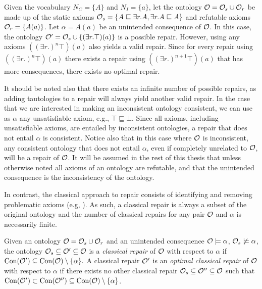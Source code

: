 \begin{example}\label{ex:no-optimal}
  Given the vocabulary $N_C = \{ A \}$ and $N_I = \{ a \}$, let the ontology $\mathcal{O} = \mathcal{O}_s \cup \mathcal{O}_r$ be made up of the static axioms $\mathcal{O}_s = \{ A \sqsubseteq \exists r.A, \exists r.A \sqsubseteq A \}$ and refutable axioms $\mathcal{O}_r = \{ A(a) \}$. Let $\alpha = A(a)$ be an unintended consequence of $\mathcal{O}$. In this case, the ontology $\mathcal{O}' = \mathcal{O}_s \cup \{ (\exists r.\top) (a) \}$ is a possible repair. However, using any axioms $((\exists r.)^n\top) (a)$ also yields a valid repair. Since for every repair using $((\exists r.)^n\top) (a)$ there exists a repair using $((\exists r.)^{n + 1}\top) (a)$ that has more consequences, there exists no optimal repair.
\end{example}

It should be noted also that there exists an infinite number of possible repairs, as adding tautologies to a repair will always yield another valid repair. In the case that we are interested in making an inconsistent ontology consistent, we can use as $\alpha$ any unsatisfiable axiom, e.g., $\top \sqsubseteq \bot$. Since all axioms, including unsatisfiable axioms, are entailed by inconsistent ontologies, a repair that does not entail $\alpha$ is consistent. Notice also that in this case where $\mathcal{O}$ is inconsistent, any consistent ontology that does not entail $\alpha$, even if completely unrelated to $\mathcal{O}$, will be a repair of $\mathcal{O}$. It will be assumed in the rest of this thesis that unless otherwise noted all axioms of an ontology are refutable, and that the unintended consequence is the inconsistency of the ontology.

In contrast, the classical approach to repair consists of identifying and removing problematic axioms (e.g, \cite{schlobach2003non,kalyanpur2005debugging,kalyanpur2006repairing,BaPS07}). As such, a classical repair is always a subset of the original ontology and the number of classical repairs for any pair $\mathcal{O}$ and $\alpha$ is necessarily finite.

\begin{definition}
  Given an ontology $\mathcal{O} = \mathcal{O}_s \cup \mathcal{O}_r$ and an unintended consequence $\mathcal{O} \models \alpha$, $\mathcal{O}_s \not\models \alpha$, the ontology $\mathcal{O}_s \subseteq \mathcal{O}' \subseteq \mathcal{O}$ is a \emph{classical repair} of $\mathcal{O}$ with respect to $\alpha$ if $\operatorname{Con}(\mathcal{O}') \subseteq \operatorname{Con}(\mathcal{O}) \setminus \{\alpha\}.$ A classical repair $\mathcal{O}'$ is an \emph{optimal classical repair} of $\mathcal{O}$ with respect to $\alpha$ if there exists no other classical repair $\mathcal{O}_s \subseteq \mathcal{O}'' \subseteq \mathcal{O}$ such that $\operatorname{Con}(\mathcal{O}') \subset \operatorname{Con}(\mathcal{O}'') \subseteq \operatorname{Con}(\mathcal{O}) \setminus \{\alpha\}$.
\end{definition}

